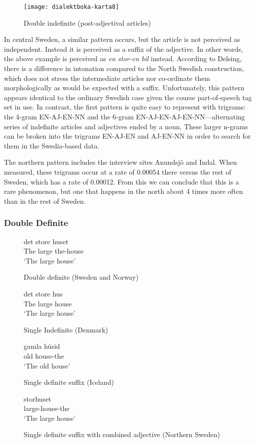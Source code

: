 \begin{figure}
  \texttt{[image: dialektboka-karta8]}
  \caption{Double indefinite (post-adjectival articles)}
  \label{double-indefinite-map}
\end{figure}

In central Sweden, a similar pattern occurs, but the article is not
perceived as independent. Instead it is perceived as a suffix of the
adjective. In other words, the above example is perceived as {\it en
  stor-en bil} instead. According to Delsing, there is a difference in
intonation compared to the North Swedish construction, which does not
stress the intermediate articles nor co-ordinate them morphologically
as would be expected with a suffix. Unfortunately, this pattern
appears identical to the ordinary Swedish case given the course
part-of-speech tag set in use.  In contrast, the first pattern is
quite easy to represent with trigrams: the 4-gram EN-AJ-EN-NN and the
6-gram EN-AJ-EN-AJ-EN-NN---alternating series of indefinite articles
and adjectives ended by a noun. These larger n-grams can be broken
into the trigrams EN-AJ-EN and AJ-EN-NN in order to search for them in
the Swedia-based data.

The northern pattern includes the interview sites Anundsj\"o and
Indal. When measured, these trigrams occur at a rate of 0.00054 there
versus the rest of Sweden, which has a rate of 0.00012. From this we
can conclude that this is a rare phenomenon, but one that happens in
the north about 4 times more often than in the rest of Sweden.

\subsubsection{Double Definite}

\begin{figure}
 \gll det store huset \\
  The large the-house \\
  \trans `The large house'
  \caption{Double definite (Sweden and Norway)}
  \label{double-definite-example}
\end{figure}
\begin{figure}
 \gll det store hus \\
  The large house\\
  \trans `The large house'
  \caption{Single Indefinite (Denmark)}
  \label{single-definite-example}
\end{figure}
\begin{figure}
  \gll gamla h\'usid \\
  old house-the \\
  \trans `The old house'
  \caption{Single definite suffix (Iceland)}
  \label{single-definite-suffix-example}
\end{figure}
\begin{figure}
 \gll storhuset \\
  large-house-the \\
  \trans `The large house'
  \caption{Single definite suffix with combined adjective (Northern Sweden)}
  \label{adjective-single-definite-suffix-example}
\end{figure}


